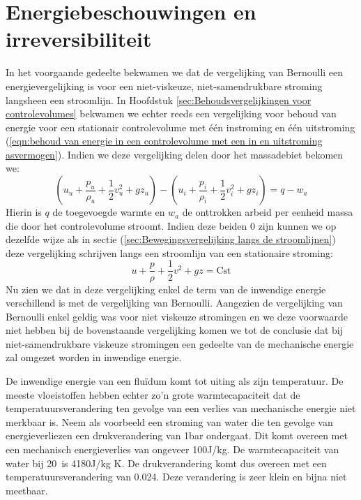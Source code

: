 	\section{Energiebeschouwingen en irreversibiliteit}
	\label{sec:Energiebeschouwingen en irreversibiliteit}
In het voorgaande gedeelte bekwamen we dat de vergelijking van Bernoulli een energievergelijking is voor een niet-viskeuze, niet-samendrukbare stroming langsheen een stroomlijn. In Hoofdstuk \ref{sec:Behoudsvergelijkingen voor controlevolumes} bekwamen we echter reeds een vergelijking voor behoud van energie voor een stationair controlevolume met één instroming en één uitstroming (\ref{eqn:behoud van energie in een controlevolume met een in en uitstroming asvermogen}). Indien we deze vergelijking delen door het massadebiet bekomen we:
\begin{equation}
	(u_u + \frac{p_u}{\rho_u} + \frac{1}{2}v^2_u + g z_u) - (u_i + \frac{p_i}{\rho_i}+ \frac{1}{2}v^2_i + g z_i) = q-w_a
\end{equation}
Hierin is $q$ de toegevoegde warmte en $w_a$ de onttrokken arbeid per eenheid massa die door het controlevolume stroomt. Indien deze beiden $0$ zijn kunnen we op dezelfde wijze als in sectie (\ref{sec:Bewegingsvergelijking langs de stroomlijnen}) deze vergelijking schrijven langs een stroomlijn van een stationaire stroming:
\begin{equation}
	u + \frac{p}{\rho} + \frac{1}{2}v^2 + g z = \text{Cst}
	\label{eqn:behoud van energie lang een stroomlijn}
\end{equation}
Nu zien we dat in deze vergelijking enkel de term van de inwendige energie verschillend is met de vergelijking van Bernoulli. Aangezien de vergelijking van Bernoulli enkel geldig was voor niet viskeuze stromingen en we deze voorwaarde niet hebben bij de bovenstaande vergelijking komen we tot de conclusie dat bij niet-samendrukbare viskeuze stromingen een gedeelte van de mechanische energie zal omgezet worden in inwendige energie.

De inwendige energie van een fluïdum komt tot uiting als zijn temperatuur. De meeste vloeistoffen hebben echter zo'n grote warmtecapaciteit dat de temperatuursverandering ten gevolge van een verlies van mechanische energie niet merkbaar is. Neem als voorbeeld een stroming van water die ten gevolge van energieverliezen een drukverandering van \unit{1}{bar} ondergaat. Dit komt overeen met een mechanisch energieverlies van ongeveer \unit{100}{J/kg}. De warmtecapaciteit van water bij 20\textcelsius\ is \unit{4180}{J/kg K}. De drukverandering komt dus overeen met een temperatuursverandering van 0.024\textcelsius. Deze verandering is zeer klein en bijna niet meetbaar.

